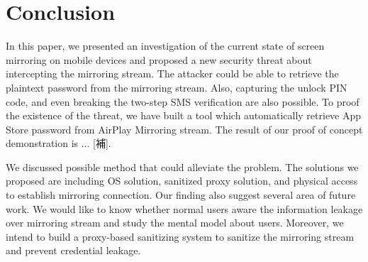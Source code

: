 \chapter{Conclusion}

In this paper, we presented an investigation of the current state of screen mirroring on mobile devices and proposed a new security threat about intercepting the mirroring stream. The attacker could be able to retrieve the plaintext password from the mirroring stream. Also, capturing the unlock PIN code, and even breaking the two-step SMS verification are also possible. To proof the existence of the threat, we have built a tool which automatically retrieve App Store password from AirPlay Mirroring stream. The result of our  proof of concept demonstration is ... [補].

We discussed possible method that could alleviate the problem. The solutions we proposed are including OS solution, sanitized proxy solution, and physical access to establish mirroring connection. Our finding also suggest several area of future work. We would like to know whether normal users aware the information leakage over mirroring stream and study the mental model about users. Moreover, we intend to build a proxy-based sanitizing system to sanitize the mirroring stream and prevent credential leakage.
